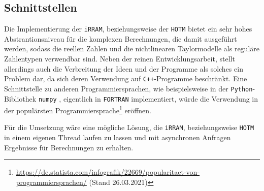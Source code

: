 \subsection*{Schnittstellen}
Die Implementierung der \verb+iRRAM+, beziehungsweise der \verb+HOTM+ bietet ein sehr hohes Abstrantionsniveau für die komplexen Berechnungen, die damit ausgeführt werden, sodass die reellen Zahlen und die nichtlinearen Taylormodelle als reguläre Zahlentypen verwendbar sind. Neben der reinen Entwicklungsarbeit, stellt allerdings auch die Verbreitung der Ideen und der Programme als solches ein Problem dar, da sich deren Verwendung auf \verb.C++.-Programme beschränkt. Eine Schnittstelle zu anderen Programmiersprachen, wie beispielsweise in der \verb+Python+-Bibliothek \verb+numpy+ \cite{harris2020array}, eigentlich in \verb+FORTRAN+ implementiert, würde die Verwendung in der populärsten Programmiersprache\footnote{\url{https://de.statista.com/infografik/22669/popularitaet-von-programmiersprachen/} (Stand 26.03.2021)} eröffnen.  


Für die Umsetzung wäre eine mögliche Lösung, die \verb+iRRAM+, beziehungsweise \verb+HOTM+ in einem eigenen Thread laufen zu lassen und mit asynchronen Anfragen Ergebnisse für Berechnungen zu erhalten.

